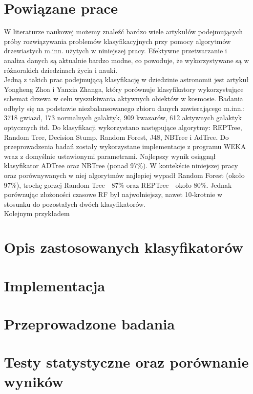 \documentclass[conference]{IEEEtran}
\begin{document}
\section{Powiązane prace}
	W literaturze naukowej możemy znaleźć bardzo wiele artykułów podejmujących próby rozwiązywania problemów klasyfikacyjnych przy pomocy algorytmów drzewiastych m.inn. użytych w niniejszej pracy. Efektywne przetwarzanie i analiza danych są aktualnie bardzo modne, co powoduje, że wykorzystywane są w różnorakich dziedzinach życia i nauki.\\ 
\indent	Jedną z takich prac podejmującą klasyfikację w dziedzinie astronomii jest artykuł Yongheng Zhoa i Yanxia Zhanga, który porównuje klasyfikatory wykorzystujące schemat drzewa w celu wyszukiwania aktywnych obiektów w kosmosie. Badania odbyły się na podstawie niezbalansowanego zbioru danych zawierającego m.inn.: 3718 gwiazd, 173 normalnych galaktyk, 909 kwazarów, 612 aktywnych galaktyk optycznych itd. Do klasyfikacji wykorzystano następujące algorytmy: REPTree, Random Tree, Decision Stump, Random Forest, J48, NBTree i AdTree. Do przeprowadzenia badań zostały wykorzystane implementacje z programu WEKA wraz z domyślnie ustawionymi parametrami. Najlepszy wynik osiągnął klasyfikator ADTree oraz NBTree (ponad 97\%). W kontekście niniejszej pracy oraz porównywanych w niej algorytmów najlepiej wypadł Random Forest (około 97\%), trochę gorzej Random Tree - 87\% oraz REPTree - około 80\%. Jednak porównując złożoności czasowe RF był najwolniejszy, nawet 10-krotnie w stosunku do pozostałych dwóch klasyfikatorów. \cite{b1} \\
\indent Kolejnym przykładem 
	
 

\section{Opis zastosowanych klasyfikatorów}

\section{Implementacja}

\section{Przeprowadzone badania}

\section{Testy statystyczne oraz porównanie wyników}
\end{document}
